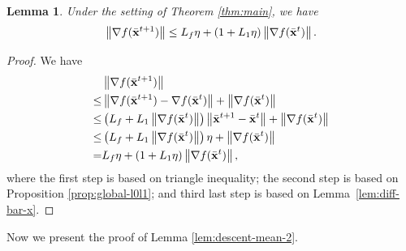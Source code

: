 \documentclass[sigconf]{acmart}
\newcommand{\Norm}[1]{\left\| #1 \right\|}
\def\vx{{\bf{x}}}
\theoremstyle{plain}
\newtheorem{lem}{Lemma}
\def\bx{{\bar\vx}}
\begin{document}
\begin{lem}\label{lem:recursion-grad}
Under the setting of Theorem \ref{thm:main}, we have
\begin{align*}
    \Norm{\nabla f(\bx^{t+1})} \leq L_f\eta + \left(1+L_1\eta\right)\Norm{\nabla f(\bx^{t})}.
\end{align*}
\end{lem}
\begin{proof}    
We have
\begin{align}\label{eq:recursion-grad}
\begin{split}    
   & \Norm{\nabla f(\bx^{t+1})} \\
\leq & \Norm{\nabla f(\bx^{t+1})-\nabla f(\bx^{t})} +   \Norm{\nabla f(\bx^{t})} \\
\leq & \left(L_f + L_1\Norm{\nabla f(\bx^{t})}\right)\Norm{\bx^{t+1}-\bx^{t}} +   \Norm{\nabla f(\bx^{t})} \\
\leq & \left(L_f + L_1\Norm{\nabla f(\bx^{t})}\right)\eta +   \Norm{\nabla f(\bx^{t})} \\
= & L_f\eta + \left(1+L_1\eta\right)\Norm{\nabla f(\bx^{t})},
\end{split}
\end{align}
where the first step is based on triangle inequality; 
the second step is based on Proposition \ref{prop:global-l0l1};
and third last step is based on Lemma~\ref{lem:diff-bar-x}.
\end{proof}
 

Now we present the proof of Lemma \ref{lem:descent-mean-2}.
\end{document}

